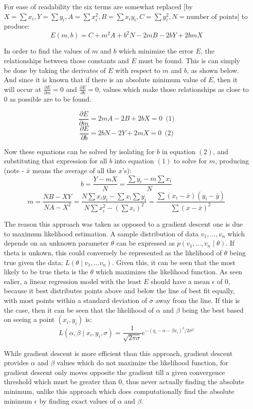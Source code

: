 For ease of readability the six terms are somewhat replaced [by $X=\sum x_i, Y=\sum y_i, A=\sum x^2_i, B=\sum x_iy_i, C=\sum y_i^2, N=\text{number of points}$] to produce:
$$E(m,b) = C + m^2A+b^2N - 2mB - 2bY + 2bmX$$

In order to find the values of $m$ and $b$ which minimize the error $E$, the relationships between those constants and $E$ must be found. This is can simply be done by taking the derivates of $E$ with respect to $m$ and $b$, as shown below. And since it is known that if there is an absolute minimum value of $E$, then it will occur at $\frac{\partial E}{\partial m}=0$ and $\frac{\partial E}{\partial b}=0$, values which make those relationships as close to 0 as possible are to be found.

$$\frac{\partial E}{\partial m}=2mA-2B+2bX=0 \enspace\text{(1)}$$
$$\frac{\partial E}{\partial b}=2bN-2Y+2mX=0 \enspace\text{(2)}$$

Now these equations can be solved by isolating for $b$ in equation $(2)$, and substituting that expression for all $b$ into equation $(1)$ to solve for $m$, producing (note - $\bar x$ means the average of all the $x$'s):
$$b=\frac{Y-mX}{N}=\frac{\sum y_i-m\sum x_i}{N}$$
$$m=\frac{NB-XY}{NA-X^2}=\frac{N\sum x_iy_i-\sum x_i\sum y_i}{N\sum x^2_i-(\sum x_i)^2}=\frac{\sum(x_i-\bar x)(y_i-\bar y)}{\sum(x-\bar x)^2}$$

The reason this approach was taken as opposed to a gradient descent one is due to maximum likelihood estimation. A sample distribution of data $v_1,\dots,v_n$ which depends on an unknown parameter $\theta$ can be expressed as $p(v_1,\dots,v_n \mid \theta)$. If theta is unkown, this could conversely be represented as the likelihood of $\theta$ being true given the data; $L(\theta \mid v_1,\dots v_n)$. Given this, it can be seen that the most likely to be true theta is the $\theta$ which maximizes the likelihood function. As seen ealier, a linear regression model with the least $E$ should have a mean $\epsilon$ of 0, because it best distributes points above and below the line of best fit equally, with most points within a standard deviation of $\sigma$ away from the line. If this is the case, then it can be seen that the likelihood of $\alpha$ and $\beta$ being the best based on seeing a point $(x_i,y_i)$ is:
$$L(\alpha,\beta \mid x_i,y_i, \sigma)=\frac{1}{\sqrt{2\pi \sigma}}e^{-(y_i-\alpha-\beta x_i)^2/2\sigma ^2}$$

While gradient descent is more efficient than this approach, gradient descent provides $\alpha$ and $\beta$ values which do not maximize the likelihood function, for gradient descent only moves opposite the gradient till a given convergence threshold which must be greater than 0, thus never actually finding the absolute minimum, unlike this approach which does computationally find the absolute minimum $\epsilon$ by finding exact values of $\alpha$ and $\beta$.


